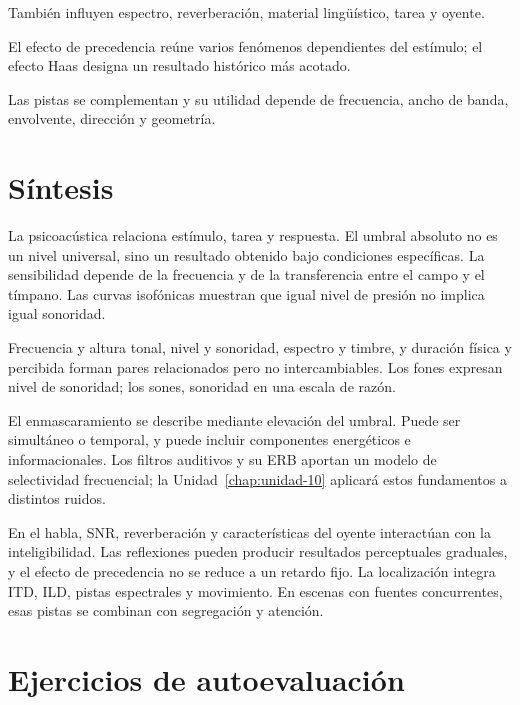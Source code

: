 \begin{description}[style=nextline]
    \item[\textbf{``Una SNR determina un porcentaje de inteligibilidad''.}]
    También influyen espectro, reverberación, material lingüístico, tarea y
    oyente.

    \item[\textbf{``Haas y precedencia son nombres de una regla de
    \(20\,\text{ms}\)''.}]
    El efecto de precedencia reúne varios fenómenos dependientes del estímulo;
    el efecto Haas designa un resultado histórico más acotado.

    \item[\textbf{``ITD localiza graves e ILD localiza agudos sin
    excepciones''.}]
    Las pistas se complementan y su utilidad depende de frecuencia, ancho de
    banda, envolvente, dirección y geometría.
\end{description}

\section{Síntesis}
\label{sec:u7-sintesis}

La psicoacústica relaciona estímulo, tarea y respuesta. El umbral absoluto no
es un nivel universal, sino un resultado obtenido bajo condiciones
específicas. La sensibilidad depende de la frecuencia y de la transferencia
entre el campo y el tímpano. Las curvas isofónicas muestran que igual nivel de
presión no implica igual sonoridad.

Frecuencia y altura tonal, nivel y sonoridad, espectro y timbre, y duración
física y percibida forman pares relacionados pero no intercambiables. Los
fones expresan nivel de sonoridad; los sones, sonoridad en una escala de razón.

El enmascaramiento se describe mediante elevación del umbral. Puede ser
simultáneo o temporal, y puede incluir componentes energéticos e
informacionales. Los filtros auditivos y su ERB aportan un modelo de
selectividad frecuencial; la Unidad~\ref{chap:unidad-10} aplicará estos fundamentos a distintos
ruidos.

En el habla, SNR, reverberación y características del oyente interactúan con la
inteligibilidad. Las reflexiones pueden producir resultados perceptuales
graduales, y el efecto de precedencia no se reduce a un retardo fijo. La
localización integra ITD, ILD, pistas espectrales y movimiento. En escenas con
fuentes concurrentes, esas pistas se combinan con segregación y atención.

\section{Ejercicios de autoevaluación}
\label{sec:u7-ejercicios}

